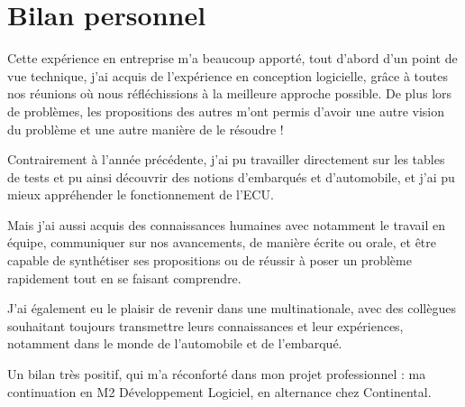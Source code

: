 \newpage
\section{Bilan personnel}
Cette expérience en entreprise m'a beaucoup apporté, tout d'abord d'un point de vue technique, j'ai acquis de l'expérience en conception logicielle, grâce
à toutes nos réunions où nous réfléchissions à la meilleure approche possible. De plus lors de problèmes, les propositions des autres m'ont permis d'avoir
une autre vision du problème et une autre manière de le résoudre !

Contrairement à l'année précédente, j'ai pu travailler directement sur les tables de tests et pu ainsi découvrir des notions d'embarqués et d'automobile, et j'ai pu mieux appréhender le fonctionnement de l'ECU. 

Mais j'ai aussi acquis des connaissances humaines avec notamment le travail en équipe, communiquer sur nos avancements, de manière écrite ou orale, et être capable de synthétiser ses
propositions ou de réussir à poser un problème rapidement tout en se faisant comprendre.

J'ai également eu le plaisir de revenir dans une multinationale, avec des collègues souhaitant toujours transmettre leurs connaissances et leur expériences, notamment dans le monde de l'automobile et de l'embarqué. 

Un bilan très positif, qui m'a réconforté dans mon projet professionnel : ma continuation en M2 Développement Logiciel, en alternance chez Continental.
